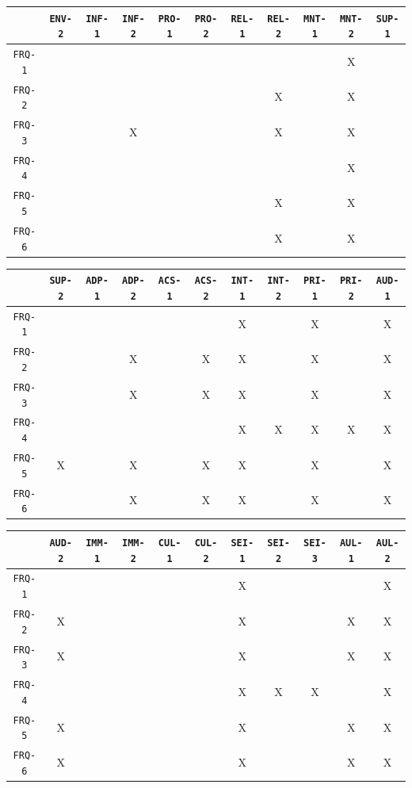\documentclass[12pt]{article}
\begin{document}
\begin{enumerate}
\begin{tabular}{|c|c|c|c|c|c|c|c|c|c|c|}
\hline
	& \texttt{ENV-2} & \texttt{INF-1} & \texttt{INF-2} & \texttt{PRO-1} & \texttt{PRO-2} & \texttt{REL-1} & \texttt{REL-2} & \texttt{MNT-1} & \texttt{MNT-2} & \texttt{SUP-1} \\
\hline
\texttt{FRQ-1} &  &  &  &  &  &  &  &  & X &  \\ \hline
\texttt{FRQ-2} &  &  &  &  &  &  & X &  & X &  \\ \hline
\texttt{FRQ-3} &  &  & X &  &  &  & X &  & X &  \\ \hline
\texttt{FRQ-4} &  &  &  &  &  &  &  &  & X &  \\ \hline
\texttt{FRQ-5} &  &  &  &  &  &  & X &  & X &  \\ \hline
\texttt{FRQ-6} &  &  &  &  &  &  & X &  & X &  \\ \hline
\end{tabular}

\begin{tabular}{|c|c|c|c|c|c|c|c|c|c|c|}
\hline
	& \texttt{SUP-2} & \texttt{ADP-1} & \texttt{ADP-2} & \texttt{ACS-1} & \texttt{ACS-2} & \texttt{INT-1} & \texttt{INT-2} & \texttt{PRI-1} & \texttt{PRI-2} & \texttt{AUD-1} \\
\hline
\texttt{FRQ-1} &  &  &  &  &  & X &  & X &  & X \\ \hline
\texttt{FRQ-2} &  &  & X &  & X & X &  & X &  & X \\ \hline
\texttt{FRQ-3} &  &  & X &  & X & X &  & X &  & X \\ \hline
\texttt{FRQ-4} &  &  &  &  &  & X & X & X & X & X \\ \hline
\texttt{FRQ-5} & X &  & X &  & X & X &  & X &  & X \\ \hline
\texttt{FRQ-6} &  &  & X &  & X & X &  & X &  & X \\ \hline
\end{tabular}

\begin{tabular}{|c|c|c|c|c|c|c|c|c|c|c|}
\hline
	& \texttt{AUD-2} & \texttt{IMM-1} & \texttt{IMM-2} & \texttt{CUL-1} & \texttt{CUL-2} & \texttt{SEI-1} & \texttt{SEI-2} & \texttt{SEI-3} & \texttt{AUL-1} & \texttt{AUL-2} \\
\hline
\texttt{FRQ-1} &  &  &  &  &  & X &  &  &  & X \\ \hline
\texttt{FRQ-2} & X &  &  &  &  & X &  &  & X & X \\ \hline
\texttt{FRQ-3} & X &  &  &  &  & X &  &  & X & X \\ \hline
\texttt{FRQ-4} &  &  &  &  &  & X & X & X &  & X \\ \hline
\texttt{FRQ-5} & X &  &  &  &  & X &  &  & X & X \\ \hline
\texttt{FRQ-6} & X &  &  &  &  & X &  &  & X & X \\ \hline
\end{tabular}


\end{enumerate}
\end{document}
